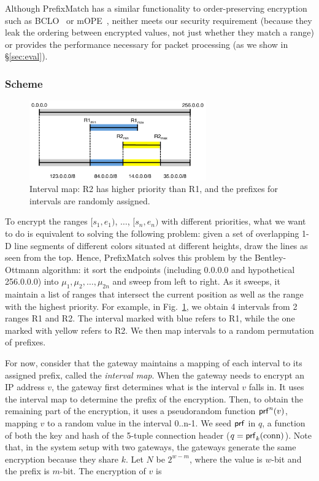 Although PrefixMatch has a similar functionality to order-preserving encryption such as BCLO~\cite{boldyreva:ope} or mOPE~\cite{popa:mope}, neither meets our security requirement (because they leak the ordering between encrypted values, not just whether they match a range) or provides the performance necessary for packet processing (as we show in \S\ref{sec:eval}).

\subsubsection{Scheme} 
\label{sec:rmscheme}

\begin{figure}[t]
  \centering
  \includegraphics[width=3in]{fig/rangeopts2.pdf}
  \caption[]{Interval map: R2 has higher priority than R1, and the prefixes for intervals are randomly assigned.\label{fig:rangeopts2}}
\end{figure}

To encrypt the ranges $[s_1, e_1)$, $\dots$, $[s_n, e_n)$ with different priorities, what we want to do is equivalent to solving the following problem: given a set of overlapping 1-D line segments of different colors situated at different heights, draw the lines as seen from the top. Hence, PrefixMatch solves this problem by the Bentley-Ottmann algorithm: it sort the endpoints (including 0.0.0.0 and hypothetical 256.0.0.0) into $\mu_1, \mu_2, \dots, \mu_{2n}$ and sweep from left to right. As it sweeps, it maintain a list of ranges that intersect the current position as well as the range with the highest priority. For example, in Fig.~\ref{fig:rangeopts2}, we obtain 4 intervals from 2 ranges R1 and R2. The interval marked with blue refers to R1, while the one marked with yellow refers to R2. We then map intervals to a random permutation of prefixes.

For now, consider that the gateway maintains a mapping of each interval to its assigned prefix, called the {\em interval map}. When the gateway needs to encrypt an IP address $v$, the gateway first determines what is the interval $v$ falls in. It uses the interval map to determine the prefix of the encryption. Then, to obtain the remaining part of the encryption, it uses a pseudorandom function $\mathsf{prf}^n(v)$, mapping $v$ to a random value in the interval 0..n-1. We seed $\mathsf{prf}$ in $q$, a function of both the key and hash of the 5-tuple connection header ($q = \mathsf{prf}_k(\text{conn})$). Note that, in the system setup with two gateways, the gateways generate the same encryption because they share $k$. Let $N$ be $2^{w-m}$, where the value is $w$-bit and the prefix is $m$-bit. The encryption of $v$ is

